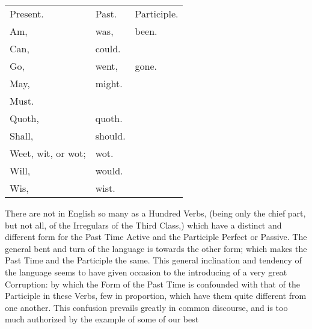 \begin{tabular}[h]{lll}
  Present. & Past. & Participle.\\
  Am, & was, & been.\\
  Can, & could.\\
  Go, & went, & gone.\\
  May, & might.\\
  Must.\\
  Quoth, & quoth.\\
  Shall, & should.\\
  Weet, wit, or wot; & wot.\\
  Will, & would.\\
  Wis, & wist.\\
\end{tabular}

There are not in English so many as a Hundred Verbs, (being only the
chief part, but not all, of the Irregulars of the Third Class,) which
have a distinct and different form for the Past Time Active and the
Participle Perfect or Passive. The general bent and turn of the language
is towards the other form; which makes the Past Time and the Participle
the same. This general inclination and tendency of the language seems to
have given occasion to the introducing of a very great Corruption: by
which the Form of the Past Time is confounded with that of the
Participle in these Verbs, few in proportion, which have them quite
different from one another. This confusion prevails greatly in common
discourse, and is too much authorized by the example of some of our best
